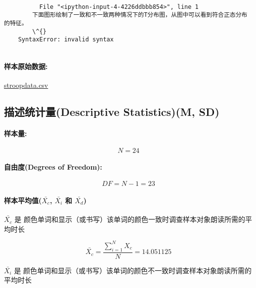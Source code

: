 \documentclass[11pt]{article}
\begin{document}
    \begin{Verbatim}[commandchars=\\\{\}]

          File "<ipython-input-4-4226ddbbb854>", line 1
        下面图形绘制了一致和不一致两种情况下的T分布图，从图中可以看到符合正态分布的特征。
        \^{}
    SyntaxError: invalid syntax


    \end{Verbatim}

    \paragraph{样本原始数据:}\label{ux6837ux672cux539fux59cbux6570ux636e}

\href{https://raw.githubusercontent.com/ShiChJ/DAND-Basic-Materials/master/P1/Project_Files/stroopdata.csv}{stroopdata.csv}

    \subsection{描述统计量(Descriptive Statistics)(M,
SD)}\label{ux63cfux8ff0ux7edfux8ba1ux91cfdescriptive-statisticsm-sd}

\paragraph{样本量:}\label{ux6837ux672cux91cf}

\[
N = 24
\]

\paragraph{自由度(Degrees of
Freedom):}\label{ux81eaux7531ux5ea6degrees-of-freedom}

\[
DF = N - 1 = 23
\]

\paragraph{\texorpdfstring{样本平均值(\(\bar{X_c}\), \(\bar{X_i}\) 和
\(\bar{X_d}\))}{样本平均值(\textbackslash{}bar\{X\_c\}, \textbackslash{}bar\{X\_i\} 和 \textbackslash{}bar\{X\_d\})}}\label{ux6837ux672cux5e73ux5747ux503cbarx_c-barx_i-ux548c-barx_d}

\(\bar{X_c}\) 是
颜色单词和显示（或书写）该单词的颜色一致时调查样本对象朗读所需的平均时长

\[
\bar{X_c} = \frac{\sum\limits_{i=1}^N X_c}{N} = 14.051125
\]

\(\bar{X_i}\) 是
颜色单词和显示（或书写）该单词的颜色不一致时调查样本对象朗读所需的平均时长
\end{document}
